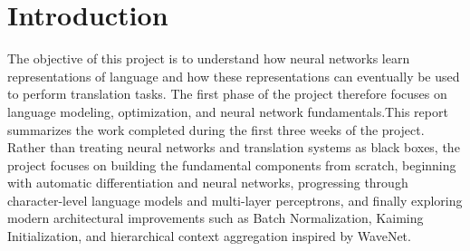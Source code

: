 \documentclass[11pt,a4paper]{article}
\begin{document}


\tableofcontents
\newpage


\section{Introduction}

The objective of this project is to understand how neural networks learn representations of language and how these representations can eventually be used to perform translation tasks. The first phase of the project therefore focuses on language modeling, optimization, and neural network fundamentals.This report summarizes the work completed during the first three weeks of the project. Rather than treating neural networks and translation systems as black boxes, the project focuses on building the fundamental components from scratch, beginning with automatic differentiation and neural networks, progressing through character-level language models and multi-layer perceptrons, and finally exploring modern architectural improvements such as Batch Normalization, Kaiming Initialization, and hierarchical context aggregation inspired by WaveNet.
\end{document}
